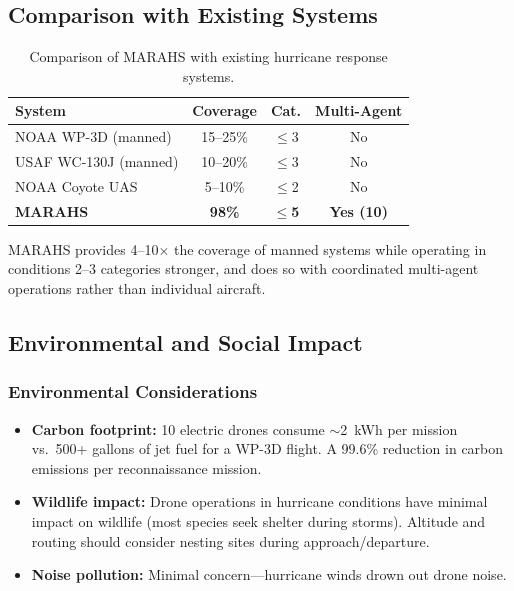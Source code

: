 \documentclass[12pt,a4paper,twocolumn]{article}
\begin{document}
\begin{enumerate}[leftmargin=*]
\subsection{Comparison with Existing Systems}
\label{sec:comparison_existing}

\begin{table}[t]
\centering
\caption{Comparison of MARAHS with existing hurricane response systems.}
\label{tab:comparison_existing}
\small
\begin{tabular}{lccc}
\toprule
\textbf{System} & \textbf{Coverage} & \textbf{Cat.} & \textbf{Multi-Agent} \\
\midrule
NOAA WP-3D (manned) & 15--25\% & $\leq$3 & No \\
USAF WC-130J (manned) & 10--20\% & $\leq$3 & No \\
NOAA Coyote UAS & 5--10\% & $\leq$2 & No \\
\textbf{MARAHS} & \textbf{98\%} & \textbf{$\leq$5} & \textbf{Yes (10)} \\
\bottomrule
\end{tabular}
\end{table}

MARAHS provides 4--10$\times$ the coverage of manned systems while operating in conditions 2--3 categories stronger, and does so with coordinated multi-agent operations rather than individual aircraft.

\subsection{Environmental and Social Impact}
\label{sec:environmental}

\subsubsection{Environmental Considerations}
\begin{itemize}[leftmargin=*]
    \item \textbf{Carbon footprint:} 10 electric drones consume $\sim$2~kWh per mission vs.\ 500+ gallons of jet fuel for a WP-3D flight. A 99.6\% reduction in carbon emissions per reconnaissance mission.
    \item \textbf{Wildlife impact:} Drone operations in hurricane conditions have minimal impact on wildlife (most species seek shelter during storms). Altitude and routing should consider nesting sites during approach/departure.
    \item \textbf{Noise pollution:} Minimal concern---hurricane winds drown out drone noise.
\end{itemize}


\end{enumerate}
\end{document}
